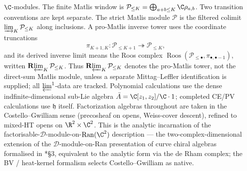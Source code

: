 $\C$-modules.  The finite Matlis window is
\(\mathcal P_{\le K}=\bigoplus_{a+b\le K}\C\rho_{a,b}\).  Two
transition conventions are kept separate.  The strict Matlis module
\(\mathcal P\) is the filtered colimit
\(\varinjlim_K\mathcal P_{\le K}\) along inclusions.  A pro-Matlis
inverse tower uses the coordinate truncations
\[
  \pi_{K+1,K}\colon \mathcal P_{\le K+1}\twoheadrightarrow
  \mathcal P_{\le K},
\]
and its derived inverse limit means the Roos complex
\(\operatorname{Roos}(\mathcal P_{\le \bullet},\pi_{\bullet,\bullet-1})\),
written \(\mathbf{R}\!\varprojlim_K\mathcal P_{\le K}\).  Thus
\(\mathbf{R}\!\varprojlim_K\mathcal P_{\le K}\) denotes the pro-Matlis
tower, not the direct-sum Matlis module, unless a separate
Mittag--Leffler identification is supplied; all \(\varprojlim^1\)-data
are tracked.  Polynomial calculations use the dense
indfinite-dimensional sub-Lie algebra $\bar A=\C[z_1,z_2]/\C\cdot 1$;
completed CE/PV calculations use $\mathfrak h$ itself.  Factorization
algebras throughout are taken in the Costello--Gwilliam sense
(precosheaf on opens, Weiss-cover descent), refined to mixed-HT opens
on $\R^2\times\C^2$.  This is the analytic incarnation of the
factorisable-$\mathcal D$-module-on-$\mathrm{Ran}(\C^2)$ description ---
the two-complex-dimensional extension of the
$\mathcal D$-module-on-Ran presentation of curve chiral algebras
formalised in \cite{beilinson-drinfeld-chiral}*{\S 3}, equivalent to the analytic
form via the de Rham complex; the BV / heat-kernel formalism selects
Costello--Gwilliam as native.

